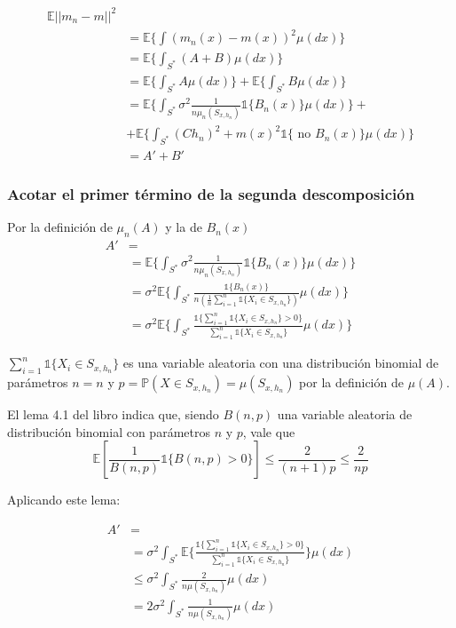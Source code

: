 \documentclass[12pt, a4paper]{article}
\begin{document}
$$
\begin{aligned}
  \mathds{E}|| m_n -m ||^2 \\
  &= \mathds{E} \Bigg\{ \int (m_n(x)-m(x))^2 \mu(dx) 
  \Bigg\} \\
  &= \mathds{E} \Bigg\{ \int_{S^{*}} (A+B) \mu(dx) 
  \Bigg\} \\
  &= \mathds{E} \Bigg\{ \int_{S^{*}} A \mu(dx) 
  \Bigg\} + \mathds{E} \Bigg\{ \int_{S^{*}} B \mu(dx) 
  \Bigg\} \\
  &= \mathds{E} \Bigg\{ \int_{S^{*}} 
      \sigma^2 \frac{ 1 }{n \mu_n(S_{x,h_n})} \mathds{1} \{ B_n(x)\}
   \mu(dx) \Bigg\} 
    + \\ &+ 
   \mathds{E} \Bigg\{ \int_{S^{*}} 
    (C h_n)^2 + m(x)^2 \mathds{1}\{ \text{ no } B_n(x) \}
   \mu(dx) 
  \Bigg\} \\
  &= A' + B'
\end{aligned}
$$

\subsubsection{Acotar el primer término de la segunda descomposición}
Por la definición de $\mu_n(A)$ y la de $B_n(x)$
$$
\begin{aligned}
  A' &= \\
  &=\mathds{E} \Bigg\{ \int_{S^{*}} \sigma^2 \frac{ 1 }{n \mu_n(S_{x,h_n})} \mathds{1} \{ B_n(x)\} \mu(dx) \Bigg\} \\
  &=\sigma^2 \mathds{E} \Bigg\{ \int_{S^{*}}  \frac{ \mathds{1} \{ B_n(x)\} }{n (\frac{1}{n} \sum_{i=1}^n \mathds{1}\{ X_i \in S_{x,h_n} \})}  \mu(dx) \Bigg\} \\
  &=\sigma^2 \mathds{E} \Bigg\{ \int_{S^{*}}  \frac{ \mathds{1} \{ 
    \sum_{i=1}^n \mathds{1}\{ X_i \in S_{x,h_n} \}>0  
  \} }{ \sum_{i=1}^n \mathds{1}\{ X_i \in S_{x,h_n} \}}  \mu(dx) \Bigg\}
\end{aligned}
$$

$\sum_{i=1}^n \mathds{1}\{ X_i \in S_{x,h_n} \}$ es una variable aleatoria con una distribución binomial de parámetros $n=n$ y $p=\mathds{P}( X \in S_{x,h_n} )=\mu(S_{x,h_n})$ por la definición de $\mu(A)$.

El lema 4.1 del libro indica que, siendo $B(n,p)$ una variable aleatoria de distribución binomial con parámetros $n$ y $p$, vale que 
$$
\mathds{E}[\frac{1}{B(n,p)} \mathds{1} \{ B(n,p)>0 \}] \leq \frac{2}{(n+1)p} \leq \frac{2}{np}
$$

Aplicando este lema:

$$
\begin{aligned}
  A' &= \\
  &= \sigma^2 \int_{S^{*}} \mathds{E} \Bigg\{   \frac{ \mathds{1} \{ 
    \sum_{i=1}^n \mathds{1}\{ X_i \in S_{x,h_n} \}>0  
  \} }{ \sum_{i=1}^n \mathds{1}\{ X_i \in S_{x,h_n} \}} \Bigg\} \mu(dx) \\
  &\leq \sigma^2 \int_{S^{*}} \frac{2}{n\mu(S_{x,h_n})}\mu(dx) \\
  &= 2 \sigma^2 \int_{S^{*}} \frac{1}{n\mu(S_{x,h_n})}\mu(dx) \\
\end{aligned}
$$
\end{document}
